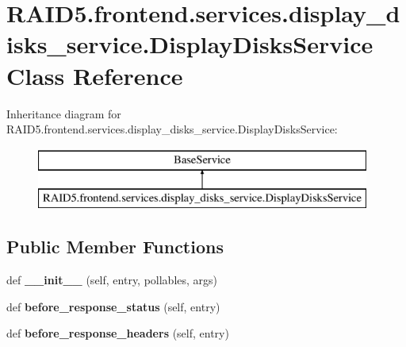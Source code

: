 \hypertarget{class_r_a_i_d5_1_1frontend_1_1services_1_1display__disks__service_1_1_display_disks_service}{}\section{R\+A\+I\+D5.\+frontend.\+services.\+display\+\_\+disks\+\_\+service.\+Display\+Disks\+Service Class Reference}
\label{class_r_a_i_d5_1_1frontend_1_1services_1_1display__disks__service_1_1_display_disks_service}
Inheritance diagram for R\+A\+I\+D5.\+frontend.\+services.\+display\+\_\+disks\+\_\+service.\+Display\+Disks\+Service\+:\begin{figure}[H]
\begin{center}
\leavevmode
\includegraphics[height=2.000000cm]{class_r_a_i_d5_1_1frontend_1_1services_1_1display__disks__service_1_1_display_disks_service}
\end{center}
\end{figure}
\subsection*{Public Member Functions}
\begin{DoxyCompactItemize}
\item 
\mbox{\label{class_r_a_i_d5_1_1frontend_1_1services_1_1display__disks__service_1_1_display_disks_service_a1e7c2fb442f4fef408fc50fd15affbc6}} 
def {\bfseries \+\_\+\+\_\+init\+\_\+\+\_\+} (self, entry, pollables, args)
\item 
\mbox{\label{class_r_a_i_d5_1_1frontend_1_1services_1_1display__disks__service_1_1_display_disks_service_a1a2fcd40542c99bb39aec33aa4fd2895}} 
def {\bfseries before\+\_\+response\+\_\+status} (self, entry)
\item 
\mbox{\label{class_r_a_i_d5_1_1frontend_1_1services_1_1display__disks__service_1_1_display_disks_service_ab858414cf065474f9ed5b24bcc376b28}} 
def {\bfseries before\+\_\+response\+\_\+headers} (self, entry)
\end{DoxyCompactItemize}
